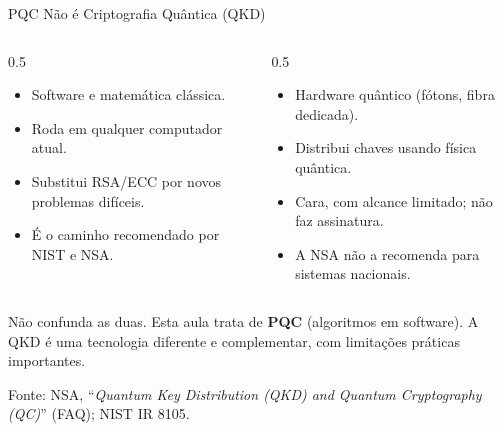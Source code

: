 \documentclass{beamer}
\begin{document}
\begin{frame}{PQC Não é Criptografia Quântica (QKD)}
    \begin{columns}[T]
        \begin{column}{0.5\textwidth}
            \begin{tcolorbox}[colback=green!6,colframe=green!50!black,boxrule=0.5pt,title={\footnotesize Criptografia Pós-Quântica (PQC)}]
                \footnotesize
                \begin{itemize}
                    \item Software e matemática clássica.
                    \item Roda em qualquer computador atual.
                    \item Substitui RSA/ECC por novos problemas difíceis.
                    \item É o caminho recomendado por NIST e NSA.
                \end{itemize}
            \end{tcolorbox}
        \end{column}
        \begin{column}{0.5\textwidth}
            \begin{tcolorbox}[colback=blue!5,colframe=blue!50!black,boxrule=0.5pt,title={\footnotesize Distribuição Quântica de Chave (QKD)}]
                \footnotesize
                \begin{itemize}
                    \item Hardware quântico (fótons, fibra dedicada).
                    \item Distribui chaves usando física quântica.
                    \item Cara, com alcance limitado; não faz assinatura.
                    \item A NSA não a recomenda para sistemas nacionais.
                \end{itemize}
            \end{tcolorbox}
        \end{column}
    \end{columns}
    \medskip
    \begin{tcolorbox}[colback=red!5,colframe=red!60!black,boxrule=0.5pt]
        \footnotesize
        Não confunda as duas. Esta aula trata de \textbf{PQC} (algoritmos em software). A QKD é uma tecnologia diferente e complementar, com limitações práticas importantes.
    \end{tcolorbox}
    \smallskip
    {\tiny Fonte: NSA, ``\textit{Quantum Key Distribution (QKD) and Quantum Cryptography (QC)}'' (FAQ); NIST IR 8105.}
\end{frame}
\end{document}
